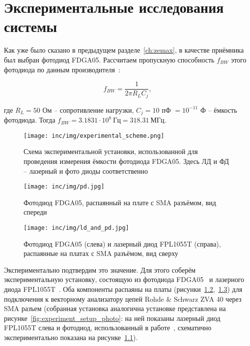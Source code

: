 \chapter{Экспериментальные исследования системы}
\label{ch:experiment}

Как уже было сказано в предыдущем разделе~\ref{ch:zemax}, в качестве приёмника был выбран фотодиод FDGA05. Рассчитаем пропускную способность $f_{BW}$ этого фотодиода по данным производителя~\cite{PDThorlabs}:

\begin{equation}
    f_{BW} = \frac{1}{2\pi R_L C_j},
\end{equation}

где $R_L = 50$ Ом \--- сопротивление нагрузки, $C_j = 10$ пФ $= 10^{-11}$ Ф \--- ёмкость фотодиода. Тогда $f_{BW} = 3.1831 \cdot 10^8~\text{Гц} = 318.31~\text{МГц}$.

\begin{figure}[!h]
    \centering
    \texttt{[image: inc/img/experimental\_scheme.png]}
    \caption{Схема экспериментальной установки, использованной для проведения измерения ёмкости фотодиода FDGA05. Здесь ЛД и ФД \--- лазерный и фото диоды соответственно}
    \label{fig:experimental_scheme}
\end{figure}

\begin{figure}[!h]
    \centering
    \texttt{[image: inc/img/pd.jpg]}
    \caption{Фотодиод FDGA05, распаянный на плате с SMA разъёмом, вид спереди}
    \label{fig:pd_sma}
\end{figure}

\begin{figure}[!h]
    \centering
    \texttt{[image: inc/img/ld\_and\_pd.jpg]}
    \caption{Фотодиод FDGA05 (слева) и лазерный диод FPL1055T (справа), распаянные на платах с SMA разъёмом, вид сверху}
    \label{fig:ld_pd_sma}
\end{figure}

Экспериментально подтвердим это значение. Для этого соберём экспериментальную установку, состоящую из фотодиода FDGA05~\cite{PDThorlabs} и лазерного диода FPL1055T~\cite{LDThorlabs}. Оба компоненты распаяны на платы (рисунки~\ref{fig:pd_sma},~\ref{fig:ld_pd_sma}) для подключения к векторному анализатору цепей Rohde & Schwarz ZVA 40 через SMA разъем (собранная установка аналогична установке представлена на рисунке~\ref{fig:experiment_setup_photo}: на ней показаны лазерный диод FPL1055T слева и фотодиод, использованный в работе~\cite{Kozyreva2019}, схематично экспериментально показана на рисунке~\ref{fig:experimental_scheme}).

